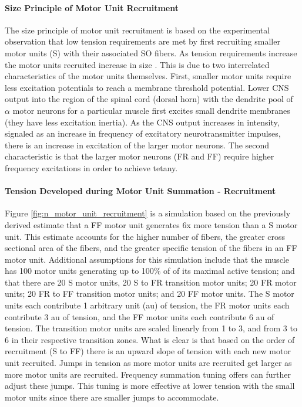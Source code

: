\paragraph{Size Principle of Motor Unit Recruitment}

The size principle of motor unit recruitment is based on the experimental observation that low tension requirements are met by first recruiting smaller motor units (S) with their associated SO fibers. As tension requirements increase the motor units recruited increase in size \cite{henneman_rank_1974}. This is due to two interrelated characteristics of the motor units themselves. First, smaller motor units require less excitation potentials to reach a membrane threshold potential. Lower CNS output into the region of the spinal cord (dorsal horn) with the dendrite pool of $\alpha$ motor neurons for a particular muscle first excites small dendrite membranes (they have less excitation inertia). As the CNS output increases in intensity, signaled as an increase in frequency of excitatory neurotransmitter impulses, there is an increase in excitation of the larger motor neurons. The second characteristic is that the larger motor neurons (FR and FF) require higher frequency excitations in order to achieve tetany.

\paragraph{Tension Developed during Motor Unit Summation - Recruitment}

Figure \ref{fig:n_motor_unit_recruitment} is a simulation based on the previously derived estimate that a FF motor unit generates 6x more tension than a S motor unit. This estimate accounts for the higher number of fibers, the greater cross sectional area of the fibers, and the greater specific tension of the fibers in an FF motor unit. Additional assumptions for this simulation include that the muscle has 100 motor units generating up to 100\% of of its maximal active tension; and that there are 20 S motor units, 20 S to FR transition motor units; 20 FR motor units; 20 FR to FF transition motor units; and 20 FF motor units. The S motor units each contribute 1 arbitrary unit (au) of tension, the FR motor units each contribute 3 au of tension, and the FF motor units each contribute 6 au of tension. The transition motor units are scaled linearly from 1 to 3, and from 3 to 6 in their respective transition zones. What is clear is that based on the order of recruitment (S to FF) there is an upward slope of tension with each new motor unit recruited. Jumps in tension as more motor units are recruited get larger as more motor units are recruited. Frequency summation tuning offers can further adjust these jumps. This tuning is more effective at lower tension with the small motor units since there are smaller jumps to accommodate.

